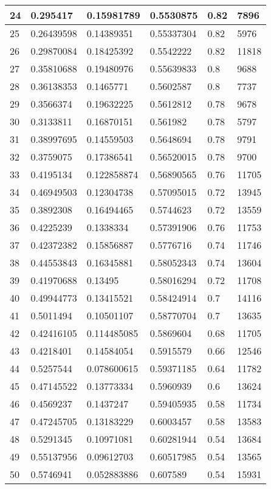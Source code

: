 \begin{longtable}{|l|l|l|l|l|l|}
24 & 0.295417 & 0.15981789 & 0.5530875 & 0.82 & 7896 \\ \hline 
25 & 0.26439598 & 0.14389351 & 0.55337304 & 0.82 & 5976 \\ \hline 
26 & 0.29870084 & 0.18425392 & 0.5542222 & 0.82 & 11818 \\ \hline 
27 & 0.35810688 & 0.19480976 & 0.55639833 & 0.8 & 9688 \\ \hline 
28 & 0.36138353 & 0.1465771 & 0.5602587 & 0.8 & 7737 \\ \hline 
29 & 0.3566374 & 0.19632225 & 0.5612812 & 0.78 & 9678 \\ \hline 
30 & 0.3133811 & 0.16870151 & 0.561982 & 0.78 & 5797 \\ \hline 
31 & 0.38997695 & 0.14559503 & 0.5648694 & 0.78 & 9791 \\ \hline 
32 & 0.3759075 & 0.17386541 & 0.56520015 & 0.78 & 9700 \\ \hline 
33 & 0.4195134 & 0.122858874 & 0.56890565 & 0.76 & 11705 \\ \hline 
34 & 0.46949503 & 0.12304738 & 0.57095015 & 0.72 & 13945 \\ \hline 
35 & 0.3892308 & 0.16494465 & 0.5744623 & 0.72 & 13559 \\ \hline 
36 & 0.4225239 & 0.1338334 & 0.57391906 & 0.76 & 11753 \\ \hline 
37 & 0.42372382 & 0.15856887 & 0.5776716 & 0.74 & 11746 \\ \hline 
38 & 0.44553843 & 0.16345881 & 0.58052343 & 0.74 & 13604 \\ \hline 
39 & 0.41970688 & 0.13495 & 0.58016294 & 0.72 & 11708 \\ \hline 
40 & 0.49944773 & 0.13415521 & 0.58424914 & 0.7 & 14116 \\ \hline 
41 & 0.5011494 & 0.10501107 & 0.58770704 & 0.7 & 13635 \\ \hline 
42 & 0.42416105 & 0.114485085 & 0.5869604 & 0.68 & 11705 \\ \hline 
43 & 0.4218401 & 0.14584054 & 0.5915579 & 0.66 & 12546 \\ \hline 
44 & 0.5257544 & 0.078600615 & 0.59371185 & 0.64 & 11782 \\ \hline 
45 & 0.47145522 & 0.13773334 & 0.5960939 & 0.6 & 13624 \\ \hline 
46 & 0.4569237 & 0.1437247 & 0.59405935 & 0.58 & 11734 \\ \hline 
47 & 0.47245705 & 0.13183229 & 0.6003457 & 0.58 & 13583 \\ \hline 
48 & 0.5291345 & 0.10971081 & 0.60281944 & 0.54 & 13684 \\ \hline 
49 & 0.55137956 & 0.09612703 & 0.60517985 & 0.54 & 13565 \\ \hline 
50 & 0.5746941 & 0.052883886 & 0.607589 & 0.54 & 15931 \\ \hline 
\end{longtable}